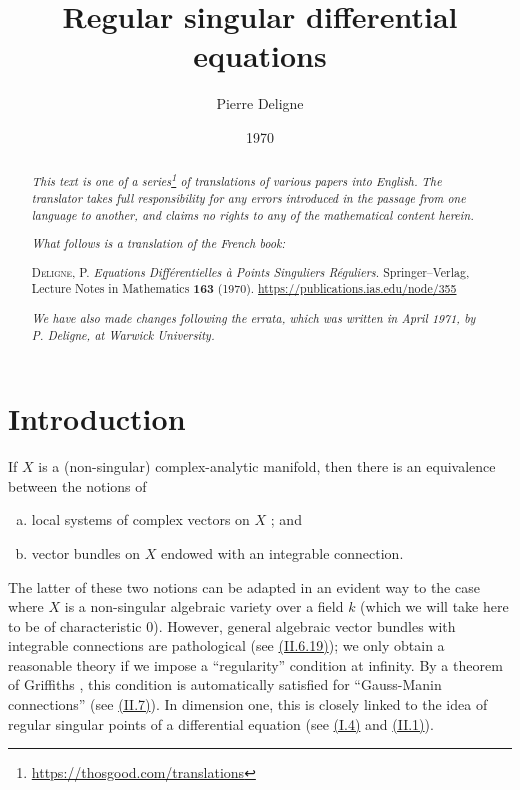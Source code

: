 \documentclass{report}
\title{Regular singular differential equations}
\author{Pierre Deligne}
\date{1970}
\newcommand{\doctype}{French book}
\newcommand{\origcit}{%
  \textsc{Deligne, P.}
  \emph{Equations Diff\'{e}rentielles \`{a} Points Singuliers R\'{e}guliers.}
  Springer--Verlag, Lecture Notes in Mathematics \textbf{163} (1970).
  {\url{https://publications.ias.edu/node/355}}%
}
\newcommand{\oldpage}[1]{\marginpar{\footnotesize$\Big\vert$ \textit{p.~#1}}}
\begin{document}
\hypersetup{pageanchor=false}
\begin{titlepage}
\maketitle
\end{titlepage}

\renewcommand{\abstractname}{Translator's note.}

\begin{abstract}
  \renewcommand*{\thefootnote}{\fnsymbol{footnote}}
  \emph{This text is one of a series\footnote{\url{https://thosgood.com/translations}} of translations of various papers into English.}
  \emph{The translator takes full responsibility for any errors introduced in the passage from one language to another, and claims no rights to any of the mathematical content herein.}

  \medskip
  
  \emph{What follows is a translation of the \doctype:}

  \medskip\noindent
  \origcit

  \medskip
  \noindent\emph{We have also made changes following the errata, which was written in April 1971, by P. Deligne, at Warwick University.}
\end{abstract}

\hypersetup{pageanchor=true}

\setcounter{footnote}{0}

\tableofcontents



\setcounter{chapter}{-1}

\chapter{Introduction}
\label{0}

\oldpage{1}
If $X$ is a (non-singular) complex-analytic manifold, then there is an equivalence between the notions of
\begin{enumerate}[a)]
  \item local systems of complex vectors on $X$ ; and
  \item vector bundles on $X$ endowed with an integrable connection.
\end{enumerate}

The latter of these two notions can be adapted in an evident way to the case where $X$ is a non-singular algebraic variety over a field $k$ (which we will take here to be of characteristic $0$).
However, general algebraic vector bundles with integrable connections are pathological (see \hyperref[II.6.19]{(II.6.19)});
we only obtain a reasonable theory if we impose a ``regularity'' condition at infinity.
By a theorem of Griffiths \cite{8}, this condition is automatically satisfied for ``Gauss-Manin connections'' (see \hyperref[II.7]{(II.7)}).
In dimension one, this is closely linked to the idea of regular singular points of a differential equation (see \hyperref[I.4]{(I.4)} and \hyperref[II.1]{(II.1)}).
\end{document}
